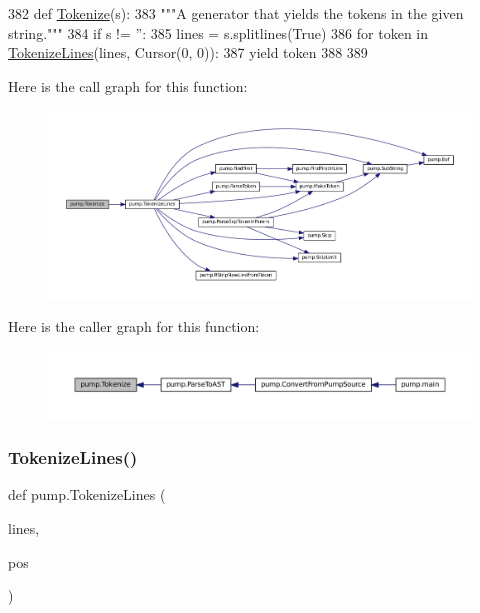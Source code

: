 \begin{DoxyCode}
382 \textcolor{keyword}{def }\hyperlink{namespacepump_aa42c23b1c914c0f86a94f2fa32999905}{Tokenize}(s):
383   \textcolor{stringliteral}{"""A generator that yields the tokens in the given string."""}
384   \textcolor{keywordflow}{if} s != \textcolor{stringliteral}{''}:
385     lines = s.splitlines(\textcolor{keyword}{True})
386     \textcolor{keywordflow}{for} token \textcolor{keywordflow}{in} \hyperlink{namespacepump_aa383d59e8e2a9507a576fd4c6b68b6b7}{TokenizeLines}(lines, Cursor(0, 0)):
387       \textcolor{keywordflow}{yield} token
388 
389 
\end{DoxyCode}
Here is the call graph for this function\+:
\nopagebreak
\begin{figure}[H]
\begin{center}
\leavevmode
\includegraphics[width=350pt]{namespacepump_aa42c23b1c914c0f86a94f2fa32999905_cgraph}
\end{center}
\end{figure}
Here is the caller graph for this function\+:
\nopagebreak
\begin{figure}[H]
\begin{center}
\leavevmode
\includegraphics[width=350pt]{namespacepump_aa42c23b1c914c0f86a94f2fa32999905_icgraph}
\end{center}
\end{figure}
\mbox{\label{namespacepump_aa383d59e8e2a9507a576fd4c6b68b6b7}} 
\subsubsection{\texorpdfstring{Tokenize\+Lines()}{TokenizeLines()}}
{\footnotesize\ttfamily def pump.\+Tokenize\+Lines (\begin{DoxyParamCaption}\item[{}]{lines,  }\item[{}]{pos }\end{DoxyParamCaption})}



